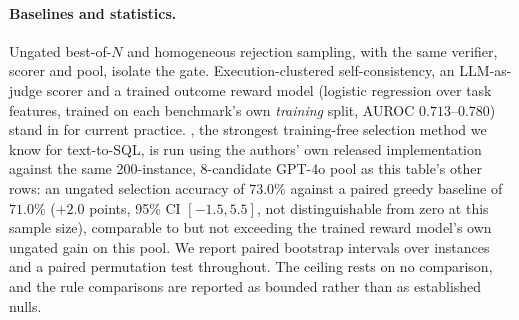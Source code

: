 \documentclass[11pt]{article}
\begin{document}
\paragraph{Baselines and statistics.} Ungated best-of-$N$ and homogeneous
rejection sampling, with the same verifier, scorer and pool, isolate the gate.
Execution-clustered self-consistency, an LLM-as-judge scorer and a trained
outcome reward model (logistic regression over task features, trained on each
benchmark's own \emph{training} split, AUROC $0.713$--$0.780$) stand in for
current practice. \citet{dpc2026}, the strongest training-free selection method we know for
text-to-SQL, is run using the authors' own released implementation against
the same 200-instance, 8-candidate GPT-4o pool as this table's other rows: an
ungated selection accuracy of $73.0\%$ against a paired greedy baseline of
$71.0\%$ ($+2.0$ points, 95\% CI $[-1.5, 5.5]$, not distinguishable from
zero at this sample size), comparable to but not
exceeding the trained reward model's own ungated gain on this pool. We report
paired bootstrap intervals over instances \citep{efron1994bootstrap} and a paired
permutation test throughout. The ceiling rests on no comparison, and the rule
comparisons are reported as bounded rather than as established nulls.

\end{document}

